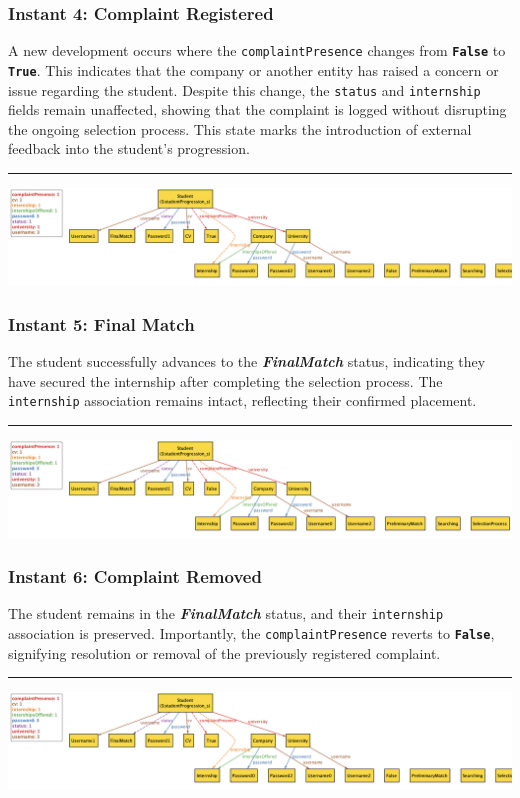 \subsubsection*{Instant 4: Complaint Registered}
A new development occurs where the \texttt{complaintPresence} changes from \textbf{\texttt{False}} to \textbf{\texttt{True}}. This indicates that the company or another entity has raised a concern or issue regarding the student. Despite this change, the \texttt{status} and \texttt{internship} fields remain unaffected, showing that the complaint is logged without disrupting the ongoing selection process. This state marks the introduction of external feedback into the student's progression.
\\
\hrule
\vspace{5mm}
\includegraphics[width=\textwidth]{a5.png}

\subsubsection*{Instant 5: Final Match}
The student successfully advances to the \textbf{\textit{FinalMatch}} status, indicating they have secured the internship after completing the selection process. The \texttt{internship} association remains intact, reflecting their confirmed placement.
\\
\hrule
\vspace{5mm}
\includegraphics[width=\textwidth]{a6.png}

\subsubsection*{Instant 6: Complaint Removed}
The student remains in the \textbf{\textit{FinalMatch}} status, and their \texttt{internship} association is preserved. Importantly, the \texttt{complaintPresence} reverts to \textbf{\texttt{False}}, signifying resolution or removal of the previously registered complaint.
\\
\hrule
\vspace{5mm}
\includegraphics[width=\textwidth]{a7.png}

